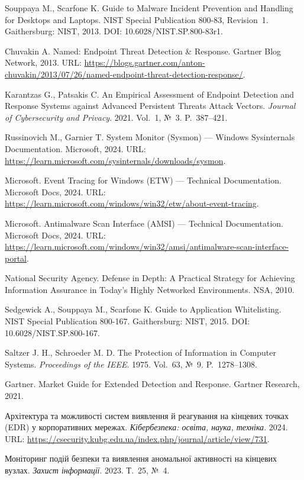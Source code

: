 
 Souppaya M., Scarfone K. Guide to Malware Incident Prevention and Handling for Desktops and Laptops. NIST Special Publication 800-83, Revision~1. Gaithersburg: NIST, 2013. DOI: 10.6028/NIST.SP.800-83r1.

 Chuvakin A. Named: Endpoint Threat Detection \& Response. Gartner Blog Network, 2013. URL: \url{https://blogs.gartner.com/anton-chuvakin/2013/07/26/named-endpoint-threat-detection-response/}.

 Karantzas G., Patsakis C. An Empirical Assessment of Endpoint Detection and Response Systems against Advanced Persistent Threats Attack Vectors. \emph{Journal of Cybersecurity and Privacy}. 2021. Vol.~1, №~3. P.~387--421.

 Russinovich M., Garnier T. System Monitor (Sysmon) --- Windows Sysinternals Documentation. Microsoft, 2024. URL: \url{https://learn.microsoft.com/sysinternals/downloads/sysmon}.

 Microsoft. Event Tracing for Windows (ETW) --- Technical Documentation. Microsoft Docs, 2024. URL: \url{https://learn.microsoft.com/windows/win32/etw/about-event-tracing}.

 Microsoft. Antimalware Scan Interface (AMSI) --- Technical Documentation. Microsoft Docs, 2024. URL: \url{https://learn.microsoft.com/windows/win32/amsi/antimalware-scan-interface-portal}.

 National Security Agency. Defense in Depth: A Practical Strategy for Achieving Information Assurance in Today's Highly Networked Environments. NSA, 2010.

 Sedgewick A., Souppaya M., Scarfone K. Guide to Application Whitelisting. NIST Special Publication 800-167. Gaithersburg: NIST, 2015. DOI: 10.6028/NIST.SP.800-167.

 Saltzer J. H., Schroeder M. D. The Protection of Information in Computer Systems. \emph{Proceedings of the IEEE}. 1975. Vol.~63, №~9. P.~1278--1308.

 Gartner. Market Guide for Extended Detection and Response. Gartner Research, 2021.

 Архітектура та можливості систем виявлення й реагування на кінцевих точках (EDR) у корпоративних мережах. \emph{Кібербезпека: освіта, наука, техніка}. 2024. URL: \url{https://csecurity.kubg.edu.ua/index.php/journal/article/view/731}.

 Моніторинг подій безпеки та виявлення аномальної активності на кінцевих вузлах. \emph{Захист інформації}. 2023. Т.~25, №~4.
